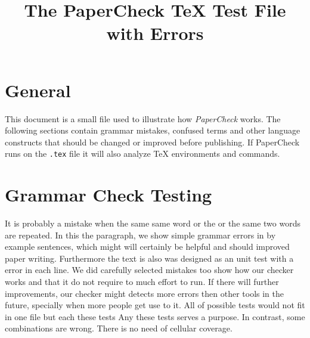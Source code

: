 \documentclass{scrartcl}
\title{The PaperCheck TeX Test File with Errors}
\begin{document}
\maketitle


\section{General}
This document is a small file used to illustrate how \emph{PaperCheck} works.
The following sections contain grammar mistakes, confused terms and other language constructs that should be changed or improved before publishing.
If PaperCheck runs on the \verb!.tex! file it will also analyze TeX environments and commands.



\section{Grammar Check Testing}
It is probably a mistake when the same same word   %
or the or the same two words are repeated.         %
In this the paragraph, we show simple grammar      %
errors in by example sentences, which              %
might will certainly be helpful                    %
and should improved paper writing.                 %
Furthermore the text                               %
is also was designed as                            %
an unit test with                                  %
a error in each line.                              %
We did carefully selected mistakes                 %
too show how our checker works                     %
and that it do not require                         %
to much effort to run.                             %
If there will further improvements,                %
our checker might detects more 
errors then other tools in 
the future, specially when more 
people get use to it.
All of possible tests would not fit
in one file but each these tests
Any these tests serves a purpose.
In contrast, some combinations are wrong.         %
There is no need of cellular coverage.            %
\end{document}
